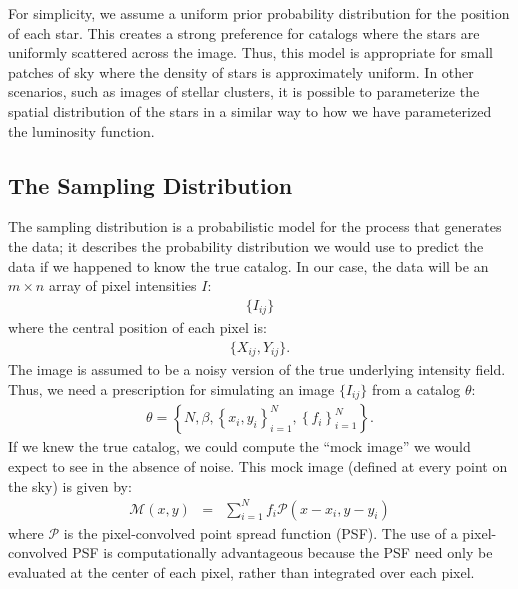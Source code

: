 \documentclass[12pt, preprint]{aastex}
\begin{document}
For simplicity, we assume a uniform prior probability distribution for the
position of each star. This creates a strong preference for catalogs where
the stars are uniformly scattered across the image. Thus, this model is
appropriate for small patches of sky where the density of stars is approximately
uniform. In other scenarios, such as images of stellar clusters, it is possible
to parameterize the spatial distribution of the stars in a similar way to how
we have parameterized the luminosity function.

\subsection{The Sampling Distribution}
The sampling distribution is a probabilistic model for the process that
generates the data; it describes the probability distribution we would use
to predict the data if we happened to know the true catalog. In our case,
the data will be an $m \times n$ array of pixel intensities $I$:
\begin{eqnarray}
\{I_{ij}\}
\end{eqnarray}
where the central position of each pixel is:
\begin{eqnarray}
\{X_{ij}, Y_{ij}\}.
\end{eqnarray}
The image is assumed to be a noisy version of the true underlying intensity
field. Thus, we need
a prescription for simulating an image $\{I_{ij}\}$ from a catalog $\theta$:
\begin{eqnarray}
\theta = \left\{N, \beta, \left\{x_i, y_i\right\}_{i=1}^N,
\left\{f_i\right\}_{i=1}^N\right\}.
\end{eqnarray}
If we knew the true catalog, we could compute the
``mock image'' we would expect to see
in the absence of noise. This mock image (defined at every point on the sky)
is given by:
\begin{eqnarray}
\mathcal{M}(x, y) &=& \sum_{i=1}^N f_i \mathcal{P}(x - x_i, y - y_i)
\end{eqnarray}
where $\mathcal{P}$ is the pixel-convolved point spread function (PSF). The use
of a pixel-convolved PSF is computationally advantageous because the PSF need
only be evaluated at the center of each pixel, rather than integrated over each
pixel.
\end{document}
